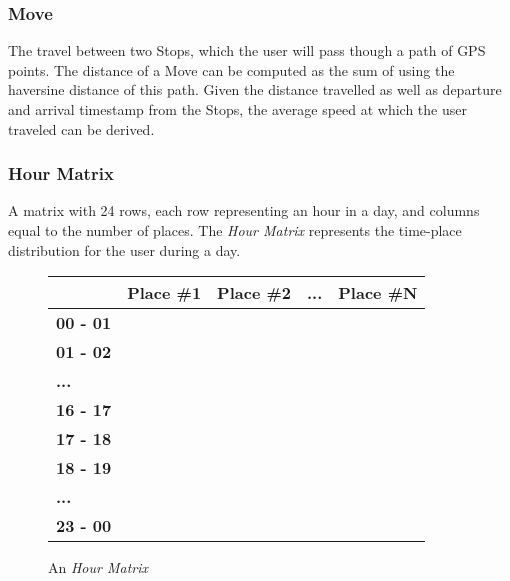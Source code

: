 \subsubsection*{Move}
The travel between two Stops, which the user will pass though a path of GPS points. The distance of a Move can be computed as the sum of using the haversine distance of this path. Given the distance travelled as well as departure and arrival timestamp from the Stops, the average speed at which the user traveled can be derived. 

\subsubsection*{Hour Matrix}
A matrix with 24 rows, each row representing an hour in a day, and columns equal to the number of places. The \textit{Hour Matrix} represents the time-place distribution for the user during a day.

\begin{figure}
    \centering
    \begin{tabular}{|l|l|l|l|l|}
    \hline
    \textbf{}        & \textbf{Place \#1} & \textbf{Place \#2} & \textbf{...} & \textbf{Place \#N} \\ \hline
    \textbf{00 - 01} &                    &                    &              &                    \\ \hline
    \textbf{01 - 02} &                    &                    &              &                    \\ \hline
    \textbf{...}     &                    &                    &              &                    \\ \hline
    \textbf{16 - 17} &                    &                    &              &                    \\ \hline
    \textbf{17 - 18} &                    &                    &              &                    \\ \hline
    \textbf{18 - 19} &                    &                    &              &                    \\ \hline
    \textbf{...}     &                    &                    &              &                    \\ \hline
    \textbf{23 - 00} &                    &                    &              &                    \\ \hline
    \end{tabular}
    \caption{An \textit{Hour Matrix}}
    \label{fig:time-table}
\end{figure}

